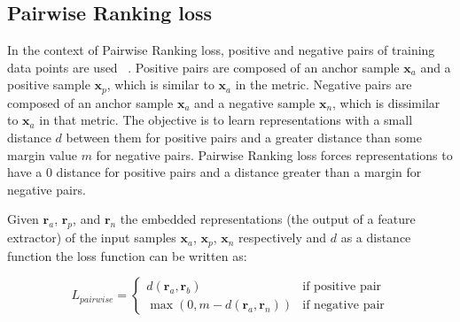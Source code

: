 \documentclass[sn-mathphys-num]{sn-jnl}%
\renewcommand\vec{\mathbf}
\begin{document}
\subsection{Pairwise Ranking loss}
    
    In the context of Pairwise Ranking loss, positive and negative pairs of training data points are used ~\cite{bromley1993signature,chopra2005learning,hadsell2006dimensionality,li2017improving}. Positive pairs are composed of an anchor sample  $\vec{x}_a$ and a positive sample $\vec{x}_p$, which is similar to $\vec{x}_a$ in the metric. Negative pairs are composed of an anchor sample $\vec{x}_a$ and a negative sample $\vec{x}_n$, which is dissimilar to $\vec{x}_a$ in that metric. The objective is to learn representations with a small distance $d$ between them for positive pairs and a greater distance than some margin value $m$ for negative pairs. Pairwise Ranking loss forces representations to have a 0 distance for positive pairs and a distance greater than a margin for negative pairs.
    
    Given $\vec{r}_a$, $\vec{r}_p$, and $\vec{r}_n$ the embedded representations (the output of a feature extractor) of the input samples $\vec{x}_a$, $\vec{x}_p$, $\vec{x}_n$ respectively and $d$ as a distance function the loss function can be written as:
    
    \begin{equation}
        {L}_{pairwise} = \begin{cases}
                                d(\vec{r}_a, \vec{r}_b) & \text{if positive pair}\\
                                \max(0,m-d(\vec{r}_a,\vec{r}_n)) &\text{if negative pair}
                                \end{cases} 
    \end{equation}
    
\end{document}
